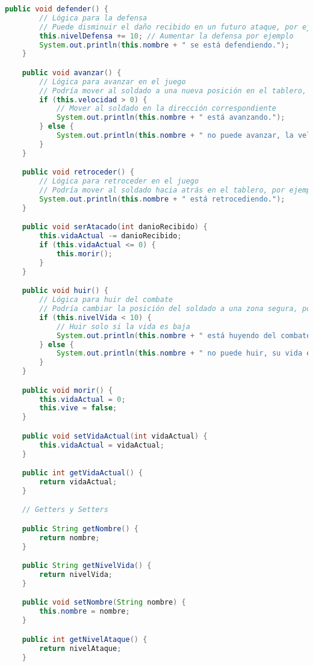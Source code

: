 \documentclass{article}
\begin{document}
\begin{itemize}
\begin{itemize}
\begin{lstlisting}[language=java]
    public void defender() {
        // Lógica para la defensa
        // Puede disminuir el daño recibido en un futuro ataque, por ejemplo
        this.nivelDefensa += 10; // Aumentar la defensa por ejemplo
        System.out.println(this.nombre + " se está defendiendo.");
    }

    public void avanzar() {
        // Lógica para avanzar en el juego
        // Podría mover al soldado a una nueva posición en el tablero, por ejemplo
        if (this.velocidad > 0) {
            // Mover al soldado en la dirección correspondiente
            System.out.println(this.nombre + " está avanzando.");
        } else {
            System.out.println(this.nombre + " no puede avanzar, la velocidad es 0.");
        }
    }

    public void retroceder() {
        // Lógica para retroceder en el juego
        // Podría mover al soldado hacia atrás en el tablero, por ejemplo
        System.out.println(this.nombre + " está retrocediendo.");
    }

    public void serAtacado(int danioRecibido) {
        this.vidaActual -= danioRecibido;
        if (this.vidaActual <= 0) {
            this.morir();
        }
    }

    public void huir() {
        // Lógica para huir del combate
        // Podría cambiar la posición del soldado a una zona segura, por ejemplo
        if (this.nivelVida < 10) {
            // Huir solo si la vida es baja
            System.out.println(this.nombre + " está huyendo del combate.");
        } else {
            System.out.println(this.nombre + " no puede huir, su vida está alta.");
        }
    }

    public void morir() {
        this.vidaActual = 0;
        this.vive = false;
    }

    public void setVidaActual(int vidaActual) {
        this.vidaActual = vidaActual;
    }

    public int getVidaActual() {
        return vidaActual;
    }

    // Getters y Setters

    public String getNombre() {
        return nombre;
    }

    public String getNivelVida() {
        return nivelVida;
    }

    public void setNombre(String nombre) {
        this.nombre = nombre;
    }

    public int getNivelAtaque() {
        return nivelAtaque;
    }


\end{lstlisting}
\end{itemize}
\end{itemize}
\end{document}
